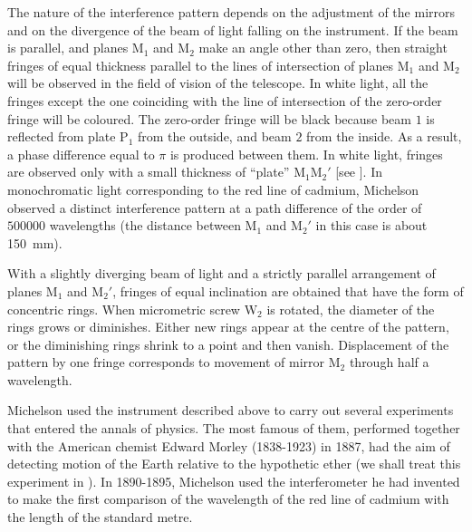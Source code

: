The nature of the interference pattern depends on the adjustment of the mirrors and on the divergence of the beam of light falling on the instrument.
If the beam is parallel, and planes M$_1$ and M$_2$ make an angle other than zero, then straight fringes of equal thickness parallel to the lines of intersection of planes M$_1$ and M$_2$ will be observed in the field of vision of the telescope.
In white light, all the fringes except the one coinciding with the line of intersection of the zero-order fringe will be coloured.
The zero-order fringe will be black because beam $1$ is reflected from plate P$_1$ from the outside, and beam $2$ from the inside.
As a result, a phase difference equal to $\pi$ is produced between them.
In white light, fringes are observed only with a small thickness of ``plate'' M$_1$M$_2'$ [see ].
In monochromatic light corresponding to the red line of cadmium, Michelson observed a distinct interference pattern at a path difference of the order of $500000$ wavelengths (the distance between M$_1$ and M$_2'$ in this case is about \SI{150}{\milli\metre}).

With a slightly diverging beam of light and a strictly parallel arrangement of planes M$_1$ and M$_2'$, fringes of equal inclination are obtained that have the form of concentric rings.
When micrometric screw W$_2$ is rotated, the diameter of the rings grows or diminishes.
Either new rings appear at the centre of the pattern, or the diminishing rings shrink to a point and then vanish.
Displacement of the pattern by one fringe corresponds to movement of mirror M$_2$ through half a wavelength.

Michelson used the instrument described above to carry out several experiments that entered the annals of physics.
The most famous of them, performed together with the American chemist Edward Morley (1838-1923) in 1887, had the aim of detecting motion of the Earth relative to the hypothetic ether (we shall treat this experiment in ).
In 1890-1895, Michelson used the interferometer he had invented to make the first comparison of the wavelength of the red line of cadmium with the length of the standard metre.

